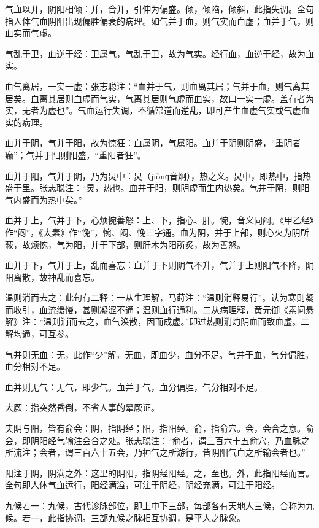 \documentclass[draft,12pt]{ctexbook}
\begin{document}
\begin{jiaozhu}
  \item 气血以并，阴阳相倾：并，合并，引伸为偏盛。倾，倾陷，倾斜，此指失调。全句指人体气血阴阳出现偏胜偏衰的病理。如气并于血，则气实而血虚；血并于气，则血实而气虚。
  \item 气乱于卫，血逆于经：卫属气，气乱于卫，故为气实。经行血，血逆于经，故为血实。
  \item 血气离居，一实一虚：张志聪注：“血并于气，则血离其居；气并于血，则气离其居矣。血离其居则血虚而气实，气离其居则气虚而血实，故曰一实一虚。盖有者为实，无者为虚也”。气血运行失调，不循常道而逆乱，即可产生血虚气实或气虚血实的病理。
  \item 血并于阴，气并于阳，故为惊狂：血属阴，气属阳。血并于阴则阴盛，“重阴者癫”；气并于阳则阳盛，“重阳者狂”。
  \item 血并于阳，气并于阴，乃为炅中：炅（jiǒnɡ音炯），热之义。炅中，即热中，指热盛于里。张志聪注：“炅，热也。血并于阳，则阴虚而生内热矣。气并于阴，则阳气内盛而为热中矣。”
  \item 血并于上，气并于下，心烦惋善怒：上、下，指心、肝。惋，音义同闷。《甲乙经》作“闷”，《太素》作“悗”，惋、闷、悗三字通。血为阴，并于上部，则心火为阴所蔽，故烦惋，气为阳，并于下部，则肝木为阳所炙，故为善怒。
  \item 血并于下，气并于上，乱而喜忘：血并于下则阴气不升，气并于上则阳气不降，阴阳离散，故神乱而喜忘。
  \item 温则消而去之：此句有二释：一从生理解，马莳注：“温则消释易行”。认为寒则凝而收引，血流缓慢，甚则凝涩不通；温则血行通利。二从病理释，黄元御《素问悬解》注：“温则消而去之，血气涣散，因而成虚。”即过热则消灼阴血而致血虚。二解均通，可互参。
  \item 气并则无血：无，此作“少”解，无血，即血少，血分不足。气并于血，气分偏胜，血分相对不足。
  \item 血并则无气：无气，即少气。血并于气，血分偏胜，气分相对不足。
  \item 大厥：指突然昏倒，不省人事的晕厥证。
  \item 夫阴与阳，皆有俞会：阴，指阴经；阳，指阳经。俞，指俞穴。会，会合之意。俞会，即阴阳经气输注会合之处。张志聪注：“俞者，谓三百六十五俞穴，乃血脉之所流注；会者，谓三百六十五会，乃神气之所游行，皆阴阳气血之所输会者也。”
  \item 阳注于阴，阴满之外：这里的阴阳，指阴经阳经。之，至也。外，此指阳经而言。全句即人体气血运行，阳经满溢，可注于阴经，阴经充满，可注于阳经。
  \item 九候若一：九候，古代诊脉部位，即上中下三部，每部各有天地人三候，合称为九候。若一，此指协调。三部九候之脉相互协调，是平人之脉象。

\end{jiaozhu}
\end{document}

